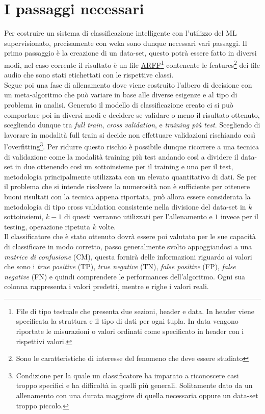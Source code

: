 \section{I passaggi necessari}
Per costruire un sistema di classificazione intelligente con l'utilizzo del ML supervisionato, precisamente con weka sono dunque necessari vari passaggi. Il primo passaggio è la creazione di un data-set, questo potrà essere fatto in diversi modi, nel caso corrente il risultato è un file \href{https://www.cs.waikato.ac.nz/ml/weka/arff.html}{ARFF}\footnote{File di tipo testuale che presenta due sezioni, header e data. In header viene specificata la struttura e il tipo di dati per ogni tupla. In data vengono riportate le misurazioni o valori ordinati come specificato in header con i rispettivi valori.} contenente le features\footnote{Sono le caratteristiche di interesse del fenomeno che deve essere studiato} dei file audio che sono stati etichettati con le rispettive classi.\\
Segue poi una fase di allenamento dove viene costruito l'albero di decisione con un meta-algoritmo che può variare in base alle diverse esigenze e al tipo di problema in analisi. Generato il modello di classificazione creato ci si può comportare poi in diversi modi e decidere se validare o meno il risultato ottenuto, scegliendo dunque tra \emph{full train}, \emph{cross validation}\label{proc:cross-validation}, e \emph{training più test}. Scegliendo di lavorare in modalità full train si decide non effettuare validazioni rischiando così l'overfitting\footnote{Condizione per la quale un classificatore ha imparato a riconoscere casi troppo specifici e ha difficoltà in quelli più generali. Solitamente dato da un allenamento con una durata maggiore di quella necessaria oppure un data-set troppo piccolo.}. Per ridurre questo rischio è possibile dunque ricorrere a una tecnica di validazione come la modalità training più test andando così a dividere il data-set in due ottenendo così un sottoinsieme per il training e uno per il test, metodologia principalmente utilizzata con un elevato quantitativo di dati. Se per il problema che si intende risolvere la numerosità non è sufficiente per ottenere buoni risultati con la tecnica appena riportata, può allora essere considerata la metodologia di tipo cross validation consistente nella divisione del data-set in $k$ sottoinsiemi, $k-1$ di questi verranno utilizzati per l'allenamento e $1$ invece per il testing, operazione ripetuta $k$ volte.\\
Il classificatore che è stato ottenuto dovrà essere poi valutato per le sue capacità di classificare in modo corretto, passo generalmente svolto appoggiandosi a una \emph{matrice di confusione} (CM), questa fornirà delle informazioni riguardo ai valori che sono i \emph{true positive} (TP), \emph{true negative} (TN), \emph{false positive} (FP), \emph{false negative} (FN) e quindi comprendere le performances dell'algoritmo. Ogni sua colonna rappresenta i valori predetti, mentre e righe i valori reali.\\
